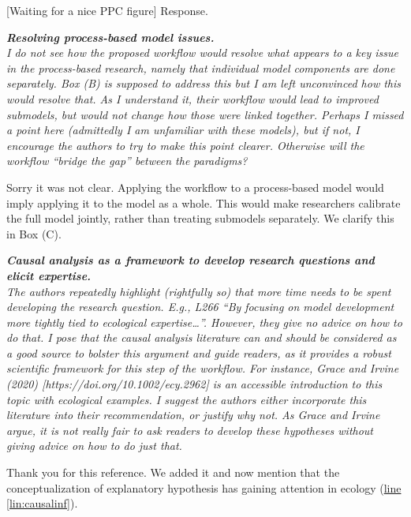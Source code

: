 \documentclass[11pt,letter]{article}
\begin{document}
[Waiting for a nice PPC figure] Response.

\begin{mybox}
\emph{\textbf{Resolving process-based model issues.}\\
I do not see how the proposed workflow would resolve what appears to a key issue in the process-based research, namely that individual model components are done separately. Box (B) is supposed to address this but I am left unconvinced how this would resolve that. As I understand it, their workflow would lead to improved submodels, but would not change how those were linked together. Perhaps I missed a point here (admittedly I am unfamiliar with these models), but if not, I encourage the authors to try to make this point clearer. Otherwise will the workflow “bridge the gap” between the paradigms?}
\end{mybox}

Sorry it was not clear. Applying the workflow to a process-based model would imply applying it to the model as a whole. This would make researchers calibrate the full model jointly, rather than treating submodels separately. We clarify this in Box (C).

\begin{mybox}
\emph{\textbf{Causal analysis as a framework to develop research questions and elicit expertise.}\\
The authors repeatedly highlight (rightfully so) that more time needs to be spent developing the research question. E.g., L266 “By focusing on model development more tightly tied to ecological expertise…”. However, they give no advice on how to do that. I pose that the causal analysis literature can and should be considered as a good source to bolster this argument and guide readers, as it provides a robust scientific framework for this step of the workflow. For instance, Grace and Irvine (2020) [https://doi.org/10.1002/ecy.2962] is an accessible introduction to this topic with ecological examples. I suggest the authors either incorporate this literature into their recommendation, or justify why not. As Grace and Irvine argue, it is not really fair to ask readers to develop these hypotheses without giving advice on how to do just that.}
\end{mybox}

Thank you for this reference. We added it and now mention that the conceptualization of explanatory hypothesis has gaining attention in ecology (\href{file:forecastflows_r1\#lintarget:causalinf}{line \ref*{lin:causalinf}}).
\end{document}
